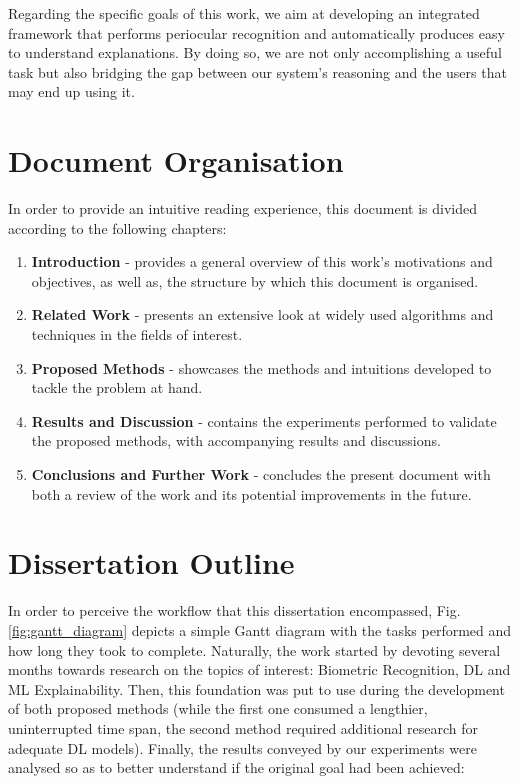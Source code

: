 Regarding the specific goals of this work, we aim at developing an integrated framework that performs periocular recognition and automatically produces easy to understand explanations. By doing so, we are not only accomplishing a useful task but also bridging the gap between our system's reasoning and the users that may end up using it.

\section{Document Organisation}
\label{sec:chap1_document_organisation}
In order to provide an intuitive reading experience, this document is divided according to the following chapters: 

\begin{enumerate}
    \item \textbf{Introduction} - provides a general overview of this work's motivations and objectives, as well as, the structure by which this document is organised.
    \item \textbf{Related Work} - presents an extensive look at widely used algorithms and techniques in the fields of interest.
    \item \textbf{Proposed Methods} - showcases the methods and intuitions developed to tackle the problem at hand.
    \item \textbf{Results and Discussion} - contains the experiments performed to validate the proposed methods, with accompanying results and discussions.
    \item \textbf{Conclusions and Further Work} - concludes the present document with both a review of the work and its potential improvements in the future.
\end{enumerate}

\section{Dissertation Outline}
\label{sec:chap1_dissertation_outline}

In order to perceive the workflow that this dissertation encompassed, Fig. \ref{fig:gantt_diagram} depicts a simple Gantt diagram with the tasks performed and how long they took to complete. Naturally, the work started by devoting several months towards research on the topics of interest: Biometric Recognition, \ac{DL} and \ac{ML} Explainability. Then, this foundation was put to use during the development of both proposed methods (while the first one consumed a lengthier, uninterrupted time span, the second method required additional research for adequate \ac{DL} models). Finally, the results conveyed by our experiments were analysed so as to better understand if the original goal had been achieved:\\

